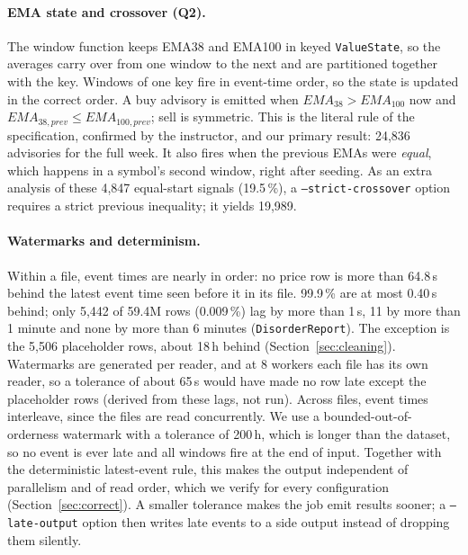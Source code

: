 \documentclass[sigconf,nonacm]{acmart}
\begin{document}
\paragraph{EMA state and crossover (Q2).} The window function keeps EMA38 and
EMA100 in keyed \texttt{ValueState}, so the averages carry over from one window
to the next and are partitioned together with the key. Windows of one key fire
in event-time order, so the state is updated in the correct order. A buy
advisory is emitted when $\mathit{EMA}_{38} > \mathit{EMA}_{100}$ now and
$\mathit{EMA}_{38,\mathit{prev}} \le \mathit{EMA}_{100,\mathit{prev}}$; sell is
symmetric. This is the literal rule of the specification, confirmed by the
instructor, and our primary result: 24,836 advisories for the full week. It
also fires when the previous EMAs were \emph{equal}, which happens in a
symbol's second window, right after seeding. As an extra analysis of these
4,847 equal-start signals (19.5\,\%), a \texttt{--strict-crossover} option
requires a strict previous inequality; it yields 19,989.

\paragraph{Watermarks and determinism.} Within a file, event times are nearly
in order: no price row is more than 64.8\,s behind the latest event time seen
before it in its file. 99.9\,\% are at most 0.40\,s behind; only 5,442 of
59.4M rows (0.009\,\%) lag by more than 1\,s, 11 by more than 1 minute and
none by more than 6 minutes (\texttt{DisorderReport}). The exception is the
5,506 placeholder rows, about 18\,h behind (Section~\ref{sec:cleaning}).
Watermarks are generated per reader, and at 8 workers each file has its own
reader, so a tolerance of about 65\,s would have made no row late except the
placeholder rows (derived from these lags, not run). Across files, event times
interleave, since the files are read concurrently. We use
a bounded-out-of-orderness watermark with a tolerance of 200\,h, which is
longer than the dataset, so no event is ever late and all windows fire at the
end of input. Together with the deterministic latest-event rule, this makes the
output independent of parallelism and of read order, which we verify for every
configuration (Section~\ref{sec:correct}). A smaller tolerance makes the job
emit results sooner; a \texttt{--late-output} option then writes late events to
a side output instead of dropping them silently.
\end{document}
